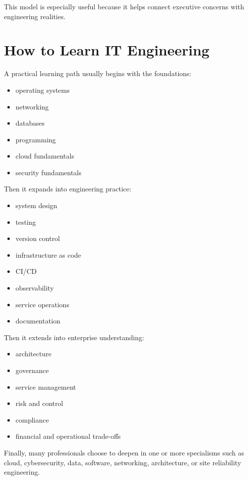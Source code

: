 \documentclass[
  british,
  letterpaper,
  DIV=11,
  numbers=noendperiod]{scrartcl}
\providecommand{\tightlist}{%
  \setlength{\itemsep}{0pt}\setlength{\parskip}{0pt}}
\begin{document}
This model is especially useful because it helps connect executive
concerns with engineering realities.

\section{How to Learn IT Engineering}\label{how-to-learn-it-engineering}

A practical learning path usually begins with the foundations:

\begin{itemize}
\tightlist
\item
  operating systems
\item
  networking
\item
  databases
\item
  programming
\item
  cloud fundamentals
\item
  security fundamentals
\end{itemize}

Then it expands into engineering practice:

\begin{itemize}
\tightlist
\item
  system design
\item
  testing
\item
  version control
\item
  infrastructure as code
\item
  CI/CD
\item
  observability
\item
  service operations
\item
  documentation
\end{itemize}

Then it extends into enterprise understanding:

\begin{itemize}
\tightlist
\item
  architecture
\item
  governance
\item
  service management
\item
  risk and control
\item
  compliance
\item
  financial and operational trade-offs
\end{itemize}

Finally, many professionals choose to deepen in one or more specialisms
such as cloud, cybersecurity, data, software, networking, architecture,
or site reliability engineering.
\end{document}
